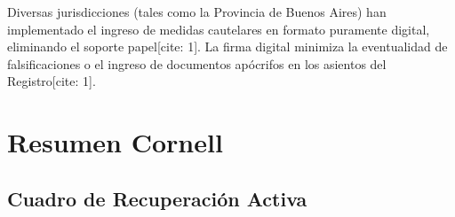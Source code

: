 \documentclass[12pt,oneside]{book}
\begin{document}
Diversas jurisdicciones (tales como la Provincia de Buenos Aires) han implementado el ingreso de medidas cautelares en formato puramente digital, eliminando el soporte papel[cite: 1]. La firma digital minimiza la eventualidad de falsificaciones o el ingreso de documentos apócrifos en los asientos del Registro[cite: 1].


\chapter{Resumen Cornell}

\section{Cuadro de Recuperación Activa}
\end{document}
